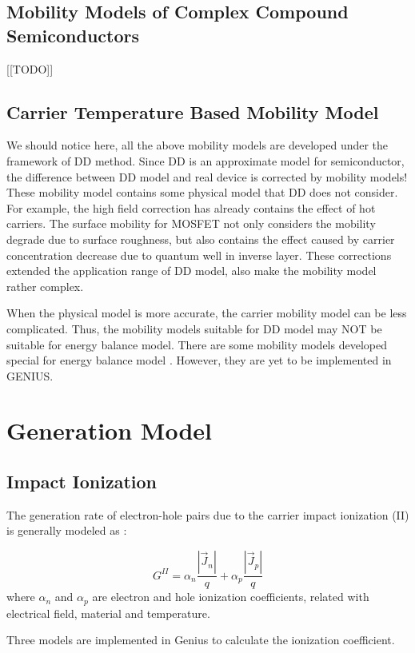 \subsection{Mobility Models of Complex Compound Semiconductors}
[[TODO]]
\par
\subsection{Carrier Temperature Based Mobility Model}
We should notice here, all the above mobility models are developed under the framework of DD method. Since
        DD is an approximate model for semiconductor, the difference between DD model and real device is corrected by
        mobility models! These mobility model contains some physical model that DD does not consider. For example, the
        high field correction has already contains the effect of hot carriers. The surface mobility for MOSFET not only
        considers the mobility degrade due to surface roughness, but also contains the effect caused by carrier
        concentration decrease due to quantum well in inverse layer. These corrections extended the application range of
        DD model, also make the mobility model rather complex.
\par
When the physical model is more accurate, the carrier mobility model can be less complicated. Thus, the
        mobility models suitable for DD model may NOT be suitable for energy balance model. There are some mobility
        models developed special for energy balance model \cite[PISCES-2ET]{}. However, they are yet to be
        implemented in GENIUS.
\par
\section{Generation Model}
\subsection{Impact Ionization}
\label{sec:Equation:Generation:II}
The generation rate of electron-hole pairs due to the carrier impact ionization (II) is generally
        modeled as \cite[Sze1981]{}:
\par
\begin{equation}
G^{II} = \alpha_n \dfrac{\left\vert \vec{J}_n \right\vert }{q} + \alpha_p \dfrac{ \left\vert
          \vec{J}_p \right\vert }{q}
\end{equation}
where $\alpha_n$ and $\alpha_p$ are electron and
        hole ionization coefficients, related with electrical field, material and temperature.
\par
Three models are implemented in Genius to calculate the ionization coefficient.
\par
